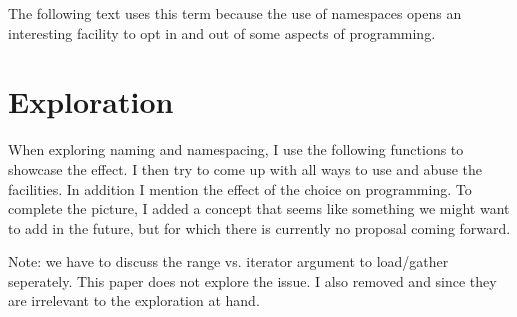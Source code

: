 The following text uses this term because the use of namespaces opens an
interesting facility to opt in and out of some aspects of \simdgeneric
programming.

\section{Exploration}

When exploring naming and namespacing, I use the following functions to showcase the effect.
I then try to come up with all ways to use and abuse the facilities.
In addition I mention the effect of the choice on \simdgeneric programming.
To complete the picture, I added a concept that seems like something we might
want to add in the future, but for which there is currently no proposal coming
forward.

Note: we have to discuss the range vs. iterator argument to load/gather seperately.
This paper does not explore the issue.
I also removed  and  since they are irrelevant
to the exploration at hand.

